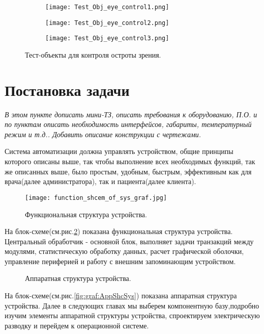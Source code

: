 \begin{figure}[ht]
    \centering
    \begin{subfigure}[b]{0.3\textwidth}
    \centering
        \texttt{[image: Test\_Obj\_eye\_control1.png]}
        \caption{}
    \end{subfigure}
    \begin{subfigure}[b]{0.3\textwidth}
    \centering
        \texttt{[image: Test\_Obj\_eye\_control2.png]}
        \caption{}
    \end{subfigure}
    \begin{subfigure}[b]{0.3\textwidth}
    \centering
        \texttt{[image: Test\_Obj\_eye\_control3.png]}
        \caption{}
    \end{subfigure}
    \caption{ Тест-объекты для контроля остроты зрения.}
    \label{fig:TestObjEC}
\end{figure}

\section{Постановка задачи}
\textit{В этом пункте дописать мини-ТЗ, описать требования к оборудованию, П.О. и по пунктам описать необходимость интерфейсов, габариты, температурный режим и т.д.. Добавить описание конструкции с чертежами.}

Система автоматизации должна управлять устройством, общие принципы которого описаны выше, так чтобы выполнение всех необходимых функций, так же описанных выше, было простым, удобным, быстрым, эффективным как для врача(далее администратора), так и пациента(далее клиента).

\begin{figure}[ht]
	\centering
     \texttt{[image: function\_shcem\_of\_sys\_graf.jpg]}
	\caption{Функциональная структура устройства.}
	\label{fig:graf:FunShcSys}
\end{figure}

 На блок-схеме(см.рис.\ref{fig:graf:FunShcSys}) показана функциональная структура устройства. Центральный обработчик - основной блок, выполняет  задачи транзакций между модулями, статистическую обработку данных, расчет графической оболочки, управление периферией и работу с внешним запоминающим устройством.

\begin{sidewaysfigure}

\centerline{}

\caption{Аппаратная структура устройства.}
\label{fig:graf:AppShcSys}

\label{label_this_fig}

\end{sidewaysfigure}
На блок-схеме(см.рис.\ref{fig:graf:AppShcSys}) показана аппаратная структура устройства.
Далее в следующих главах мы выберем компонентную базу,подробно изучим элементы аппаратной структуры устройства, спроектируем электрическую разводку и перейдем к операционной системе.